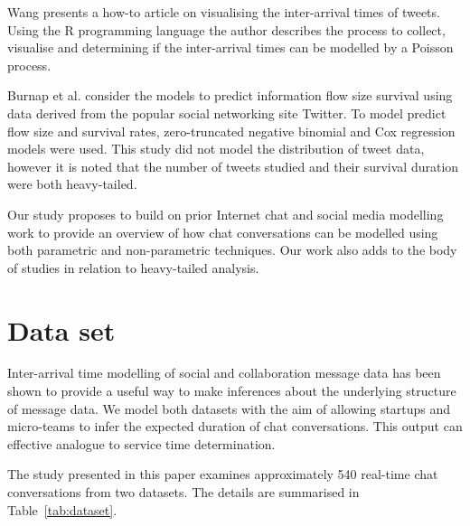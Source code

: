 \documentclass[conference]{IEEEtran}
\begin{document}
Wang \cite{viztweettimes} presents a how-to article on visualising the inter-arrival times of tweets. Using the R programming language the author describes the process to collect, visualise and determining if the inter-arrival times can be modelled by a Poisson process.

Burnap et al. \cite{burnap2014tweeting} consider the models to predict information flow size survival using data derived from the popular social networking site Twitter. To model predict flow size and survival rates, zero-truncated negative binomial and Cox regression models were used. This study did not model the distribution of tweet data, however it is noted that the number of tweets studied and their survival duration were both heavy-tailed. 

Our study proposes to build on prior Internet chat and social media modelling work to provide an overview of how chat conversations can be modelled using both parametric and non-parametric techniques. Our work also adds to the body of studies in relation to heavy-tailed analysis.



\section{Data set}

Inter-arrival time modelling of social and collaboration message data has been shown to provide a useful way to make inferences about the underlying structure of message data. We model both datasets with the aim of allowing startups and micro-teams to infer the expected duration of chat conversations. This output can effective analogue to service time determination. 

The study presented in this paper examines approximately 540 real-time chat conversations from two datasets. The details are summarised in Table~\ref{tab:dataset}. 
\end{document}
